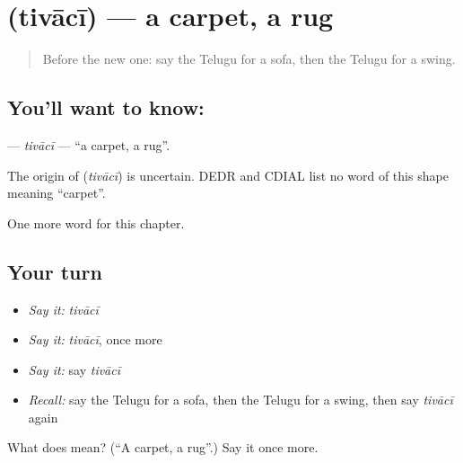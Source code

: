 \section[\texorpdfstring{\te{తివాచీ} (tivācī)}{తివాచీ (tivācī)}]{ (tivācī) — a carpet, a rug}

\label{lesson:TE-C190-tivaci}



\begin{quote}
Before the new one: say the Telugu for a sofa, then the Telugu for a swing.
\end{quote}

\subsection*{You'll want to know: }
\textbf{} — \emph{tivācī} — \textquotedblleft{}a carpet, a rug\textquotedblright{}.

\begin{cousinweb}
The origin of \textbf{} (\emph{tivācī}) is uncertain. DEDR and CDIAL list no word of this shape meaning \textquotedblleft{}carpet\textquotedblright{}.
\end{cousinweb}

\begin{grammarlens}[title={What you've built}]
One more word for this chapter.
\end{grammarlens}

\subsection*{Your turn}
\begin{itemize}
\raggedright
  \item \emph{Say it:} \emph{tivācī}
  \item \emph{Say it:} \emph{tivācī}, once more
  \item \emph{Say it:} say \emph{tivācī}
  \item \emph{Recall:} say the Telugu for a sofa, then the Telugu for a swing, then say \emph{tivācī} again
\end{itemize}

\begin{tcolorbox}[breakable,colback=teal!4,colframe=teal!35!black,title={Before you move on}]
What does  mean? (\textquotedblleft{}A carpet, a rug\textquotedblright{}.) Say it once more.
\end{tcolorbox}
